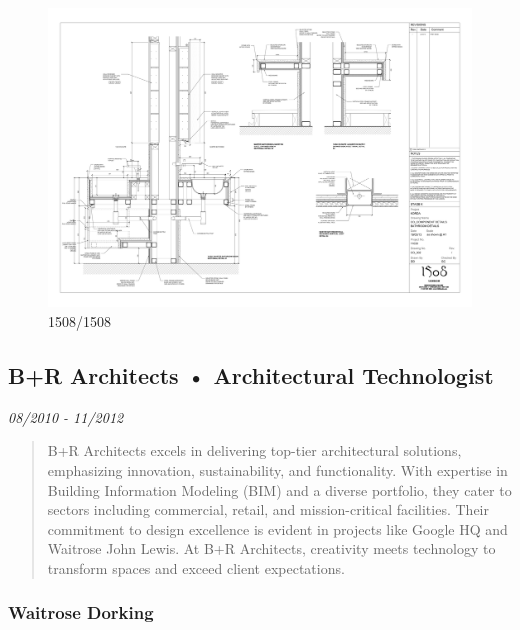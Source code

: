 \documentclass[
]{article}
\begin{document}
\begin{figure}[H]

{\centering \includegraphics{assets/1508/1508-Bathroom-Details.png}

}

\caption{1508/1508}

\end{figure}%

\subsection{B+R Architects • Architectural
Technologist}\label{br-architects-architectural-technologist}

\emph{08/2010 - 11/2012}

\begin{quote}
B+R Architects excels in delivering top-tier architectural solutions,
emphasizing innovation, sustainability, and functionality. With
expertise in Building Information Modeling (BIM) and a diverse
portfolio, they cater to sectors including commercial, retail, and
mission-critical facilities. Their commitment to design excellence is
evident in projects like Google HQ and Waitrose John Lewis. At B+R
Architects, creativity meets technology to transform spaces and exceed
client expectations.
\end{quote}

\subsubsection{Waitrose Dorking}\label{waitrose-dorking}
\end{document}
